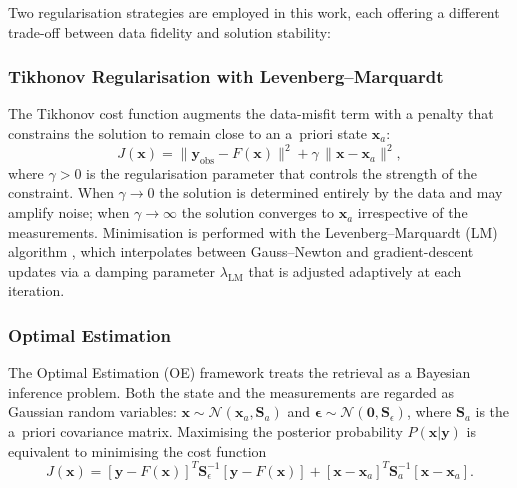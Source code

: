 \documentclass[a4paper, 11pt]{article}
\begin{document}
Two regularisation strategies are employed in this work, each offering
a different trade-off between data fidelity and solution stability:

\subsubsection{Tikhonov Regularisation with Levenberg--Marquardt}

The Tikhonov cost function \cite{tikhonov1977} augments the
data-misfit term with a penalty that constrains the solution to remain
close to an a~priori state $\mathbf{x}_a$:
%
\begin{equation}
  J(\mathbf{x})
  = \|\mathbf{y}_{\text{obs}} - F(\mathbf{x})\|^2
  + \gamma\,\|\mathbf{x} - \mathbf{x}_a\|^2,
  \label{eq:cost_tikh}
\end{equation}
%
where $\gamma > 0$ is the regularisation parameter that controls the
strength of the constraint.  When $\gamma \to 0$ the solution is
determined entirely by the data and may amplify noise; when
$\gamma \to \infty$ the solution converges to $\mathbf{x}_a$
irrespective of the measurements.  Minimisation is performed with the
Levenberg--Marquardt (LM) algorithm \cite{levenberg1944,marquardt1963},
which interpolates between Gauss--Newton and gradient-descent updates
via a damping parameter $\lambda_{\text{LM}}$ that is adjusted
adaptively at each iteration.

\subsubsection{Optimal Estimation}

The Optimal Estimation (OE) framework \cite{rodgers2000} treats the
retrieval as a Bayesian inference problem.  Both the state and the
measurements are regarded as Gaussian random variables:
$\mathbf{x} \sim \mathcal{N}(\mathbf{x}_a, \mathbf{S}_a)$ and
$\boldsymbol{\epsilon} \sim \mathcal{N}(\mathbf{0},
\mathbf{S}_\epsilon)$, where $\mathbf{S}_a$ is the a~priori covariance
matrix.  Maximising the posterior probability
$P(\mathbf{x}|\mathbf{y})$ is equivalent to minimising the cost
function
%
\begin{equation}
  J(\mathbf{x})
  = [\mathbf{y} - F(\mathbf{x})]^T \mathbf{S}_\epsilon^{-1}
    [\mathbf{y} - F(\mathbf{x})]
  + [\mathbf{x} - \mathbf{x}_a]^T \mathbf{S}_a^{-1}
    [\mathbf{x} - \mathbf{x}_a].
  \label{eq:cost_oe}
\end{equation}
\end{document}
